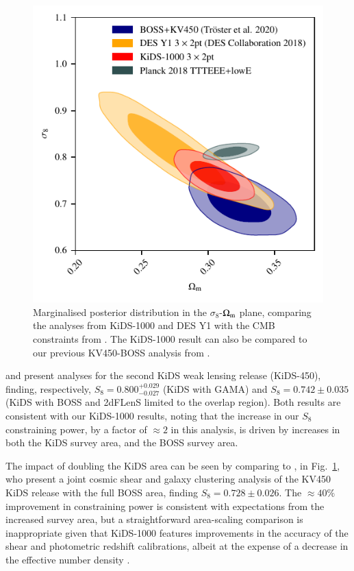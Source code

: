 \begin{figure}
	\begin{center}
		\includegraphics[width=\columnwidth]{Parameter_Plots/cosmology/omegam_sigma8_survey_comparison}
		\caption{Marginalised posterior distribution in the $\sigma_8$-$\Omega_{\rm m}$ plane, comparing the \tttp analyses from KiDS-1000 and DES Y1 \citep{abbott/etal:2018} with the CMB constraints from \citet{planck/etal:2018}.   The KiDS-1000 \tttp result can also be compared to our previous KV450-BOSS analysis from \citet{troester/etal:2020}. 
		\label{fig:DES_KiDS_comp}}
	\end{center}
\end{figure}

\citet{vanuitert/etal:2018} and \citet{joudaki/etal:2018} present \tttp analyses for the second KiDS weak lensing release (KiDS-450), finding, respectively, $S_8 = 0.800_{-0.027}^{+0.029}$ (KiDS with GAMA) and $S_8 = 0.742 \pm 0.035$ (KiDS with BOSS and 2dFLenS limited to the overlap region). 
Both results are consistent with our KiDS-1000 results, noting that the increase in our $S_8$ constraining power, by a factor of $\approx\! 2$ in this analysis, is driven by increases in both the KiDS survey area, and the BOSS survey area.  

The impact of doubling the KiDS area can be seen by comparing to \citet{troester/etal:2020}, in Fig.~\ref{fig:DES_KiDS_comp}, who present a joint cosmic shear and galaxy clustering analysis of the KV450 KiDS release with the full BOSS area, finding $S_8 = 0.728 \pm 0.026$.   The $\approx\!40\%$ improvement in constraining power is consistent with expectations from the increased survey area, but a straightforward area-scaling comparison is inappropriate given that KiDS-1000 features improvements in the accuracy of the shear and photometric redshift calibrations, albeit at the expense of a decrease in the effective number density \citep[see][for details]{giblin/etal:inprep,hildebrandt/etal:inprep}.  

